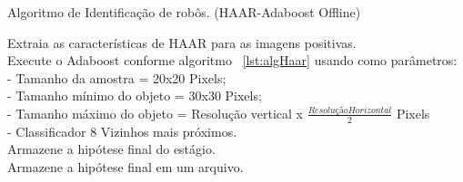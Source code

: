 \begin{algorithm}

\caption{Algoritmo de Identificação de robôs. (HAAR-Adaboost Offline)}\label{lst:algHaarOF}



{
	{
	Extraia as características de HAAR para as imagens positivas.\\
	Execute o Adaboost conforme algoritmo ~\ref{lst:algHaar} usando como parâmetros:\\
		- Tamanho da amostra = 20x20 Pixels;\\
		- Tamanho mínimo do objeto = 30x30 Pixels;\\
		- Tamanho máximo do objeto = Resolução vertical x \( \frac {Resolução Horizontal}{2}\) Pixels\\
		- Classificador 8 Vizinhos mais próximos. \\
	}
	Armazene a hipótese final do estágio.\\
}
	Armazene a hipótese final em um arquivo.

\end{algorithm}

